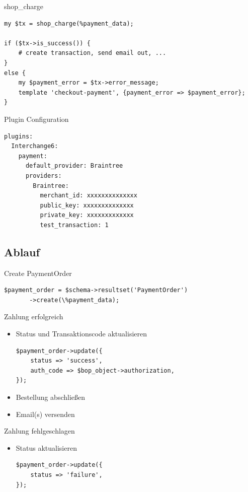 \begin{frame}[fragile]{shop\_charge}
\begin{lstlisting}
my $tx = shop_charge(%payment_data);

if ($tx->is_success()) {
    # create transaction, send email out, ...
}
else {
    my $payment_error = $tx->error_message;
    template 'checkout-payment', {payment_error => $payment_error};
}
\end{lstlisting}
\end{frame}

\begin{frame}[fragile]{Plugin Configuration}
\begin{lstlisting}
plugins:
  Interchange6:
    payment:
      default_provider: Braintree
      providers:
        Braintree:
          merchant_id: xxxxxxxxxxxxxx
          public_key: xxxxxxxxxxxxxx
          private_key: xxxxxxxxxxxxx
          test_transaction: 1
\end{lstlisting}
\end{frame}

\subsection{Ablauf}
\begin{frame}[fragile]{Create PaymentOrder}
\begin{lstlisting}
$payment_order = $schema->resultset('PaymentOrder')
       ->create(\%payment_data);
\end{lstlisting}
\end{frame}

\begin{frame}[fragile]{Zahlung erfolgreich}
\begin{itemize}
\item Status und Transaktionscode aktualisieren
\begin{lstlisting}
$payment_order->update({
    status => 'success',
    auth_code => $bop_object->authorization,
});
\end{lstlisting}
\item Bestellung abschließen
\item Email(s) versenden
\end{itemize}
\end{frame}

\begin{frame}[fragile]{Zahlung fehlgeschlagen}
\begin{itemize}
\item Status aktualisieren
\begin{lstlisting}
$payment_order->update({
    status => 'failure',
});
\end{lstlisting}
\end{itemize}
\end{frame}

